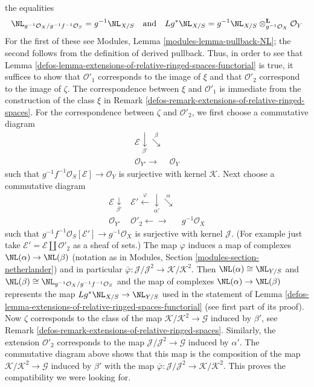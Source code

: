 \begin{remark}
the equalities
$$
\NL_{g^{-1}\mathcal{O}_X/g^{-1}f^{-1}\mathcal{O}_S} = g^{-1}\NL_{X/S}
\quad\text{and}\quad
Lg^*\NL_{X/S} =
g^{-1}\NL_{X/S} \otimes_{g^{-1}\mathcal{O}_X}^\mathbf{L} \mathcal{O}_Y
$$
For the first of these see
Modules, Lemma \ref{modules-lemma-pullback-NL}; the second
follows from the definition of derived pullback.
Thus, in order to see that
Lemma \ref{defos-lemma-extensions-of-relative-ringed-spaces-functorial}
is true, it suffices to show that $\mathcal{O}'_1$ corresponds
to the image of $\xi$ and that $\mathcal{O}'_2$ correspond to
the image of $\zeta$.
The correspondence between $\xi$ and $\mathcal{O}'_1$
is immediate from the construction of the class $\xi$ in
Remark \ref{defos-remark-extensions-of-relative-ringed-spaces}.
For the correspondence between $\zeta$ and $\mathcal{O}'_2$,
we first choose a commutative diagram
$$
\begin{array}{cc}\mathcal{E} \underset{\beta'}{\downarrow}\overset{\beta}{\searrow} &  \\ \mathcal{O}_{Y'} \longrightarrow & \mathcal{O}_Y\end{array}
$$
such that $g^{-1}f^{-1}\mathcal{O}_S[\mathcal{E}] \to \mathcal{O}_Y$
is surjective with kernel $\mathcal{K}$. Next choose a
commutative diagram
$$
\begin{array}{ccc}\mathcal{E} \underset{\beta'}{\downarrow} & \mathcal{E}' \overset{\varphi}{\longleftarrow}\underset{\alpha'}{\downarrow}\overset{\alpha}{\searrow} &  \\ \mathcal{O}_{Y'} & \mathcal{O}'_2 \longleftarrow\longrightarrow & g^{-1}\mathcal{O}_X\end{array}
$$
such that $g^{-1}f^{-1}\mathcal{O}_S[\mathcal{E}'] \to g^{-1}\mathcal{O}_X$
is surjective with kernel $\mathcal{J}$. (For example just take
$\mathcal{E}' = \mathcal{E} \amalg \mathcal{O}'_2$ as a sheaf of sets.)
The map $\varphi$ induces a map of complexes $\NL(\alpha) \to \NL(\beta)$
(notation as in Modules, Section \ref{modules-section-netherlander})
and in particular
$\bar\varphi : \mathcal{J}/\mathcal{J}^2 \to \mathcal{K}/\mathcal{K}^2$.
Then $\NL(\alpha) \cong \NL_{Y/S}$ and
$\NL(\beta) \cong \NL_{g^{-1}\mathcal{O}_X/g^{-1}f^{-1}\mathcal{O}_S}$
and the map of complexes $\NL(\alpha) \to \NL(\beta)$
represents the map $Lg^*\NL_{X/S} \to \NL_{Y/S}$ used in the
statement of Lemma \ref{defos-lemma-extensions-of-relative-ringed-spaces-functorial}
(see first part of its proof). Now $\zeta$ corresponds to the
class of the map $\mathcal{K}/\mathcal{K}^2 \to \mathcal{G}$
induced by $\beta'$, see
Remark \ref{defos-remark-extensions-of-relative-ringed-spaces}.
Similarly, the extension $\mathcal{O}'_2$ corresponds to the map
$\mathcal{J}/\mathcal{J}^2 \to \mathcal{G}$ induced by $\alpha'$.
The commutative diagram above shows that this map is
the composition of the map $\mathcal{K}/\mathcal{K}^2 \to \mathcal{G}$
induced by $\beta'$ with the map
$\bar\varphi : \mathcal{J}/\mathcal{J}^2 \to \mathcal{K}/\mathcal{K}^2$.
This proves the compatibility we were looking for.
\end{remark}

